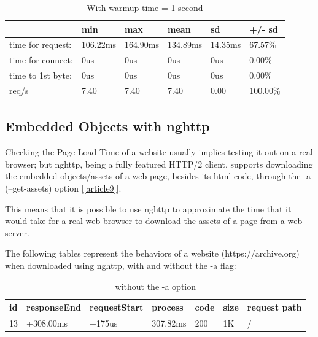 \documentclass[a4paper,10pt]{article}
\begin{document}
\begin{table}[h!]
\centering
\begin{tabular}{|l|l|l|l|l|l|}
\hline
                  & min      & max      & mean     & sd      & +/- sd   \\ \hline
time for request: & 106.22ms & 164.90ms & 134.89ms & 14.35ms & 67.57\%  \\ \hline
time for connect: & 0us      & 0us      & 0us      & 0us     & 0.00\%   \\ \hline
time to 1st byte: & 0us      & 0us      & 0us      & 0us     & 0.00\%   \\ \hline
req/s             & 7.40     & 7.40     & 7.40     & 0.00    & 100.00\% \\ \hline
\end{tabular}

\caption{With warmup time = 1 second}
\label{fig:table5}

\end{table}


\subsection{Embedded Objects with nghttp}


Checking the Page Load Time of a website usually implies testing it out on a real browser; but nghttp, being a fully featured HTTP/2 client, supports downloading the embedded objects/assets of a web page, besides its html code, through the -a (--get-assets) option [\ref{article9}]. 


This means that it is possible to use nghttp to approximate the time that it would take for a real web browser to download the assets of a page from a web server. 

The following tables represent the behaviors of a website (https://archive.org) when downloaded using nghttp, with and without the -a flag:



\begin{table}[h!]
\centering
\begin{tabular}{|l|l|l|l|l|l|l|}
\hline
id & responseEnd & requestStart & process  & code & size & request path \\ \hline
13 & +308.00ms   & +175us       & 307.82ms & 200  & 1K   & /            \\ \hline

\end{tabular}

\caption{without the -a option}
\label{fig:table6}
\end{table}
\end{document}
